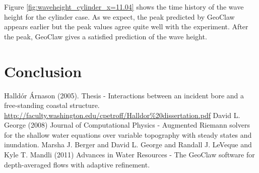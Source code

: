 \documentclass[11pt]{article}
\begin{document}
\par
Figure \ref{fig:waveheight_cylinder_x=11.04} shows the time history of the wave height for the cylinder case. As we expect, the peak predicted by GeoClaw appears earlier but the peak values agree quite well with the experiment.
After the peak, GeoClaw gives a satisfied prediction of the wave height.

\section{Conclusion}\label{Sec:Conclusion}

{\footnotesize
\begin{thebibliography}{100}
 Halld\'or \'Arnason  (2005). Thesis - Interactions between an incident bore and a free-standing coastal structure. \url{http://faculty.washington.edu/cpetroff/Halldor%20dissertation.pdf}
 David L. George (2008) Journal of Computational Physics - Augmented Riemann solvers for the shallow water equations over variable topography with steady states and inundation.
 Marsha J. Berger and David L. George and Randall J. LeVeque and Kyle T. Mandli (2011) Advances in Water Resources - The GeoClaw software for depth-averaged flows with adaptive refinement.
\end{thebibliography}
}
\end{document}
